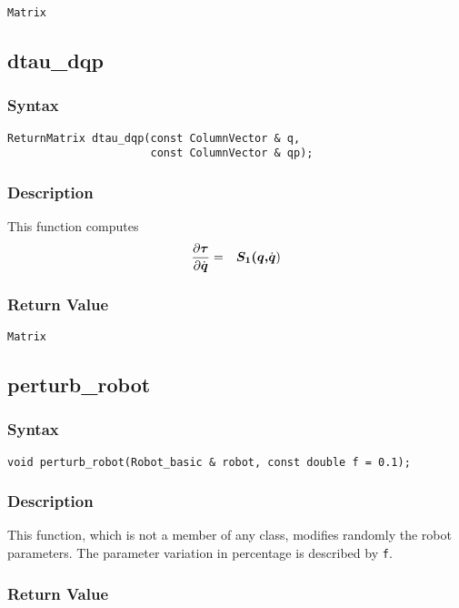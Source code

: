 \documentclass[dvips,11pt,fleqn]{report}
\newcommand{\mbold}[1]{\mbox{\boldmath $ #1 $}}
\newcommand{\dfdx}[2]{\frac{\partial #1}{\partial #2}}
\begin{document}
{\tt Matrix}

\newpage

\subsection*{dtau\_dqp}
\subsubsection*{Syntax}
\begin{verbatim}
ReturnMatrix dtau_dqp(const ColumnVector & q, 
                      const ColumnVector & qp);
\end{verbatim}
\subsubsection*{Description}
This function computes 
\begin{eqnarray}
\dfdx{\mbold{\tau}}{\dot{\mbold{q}}} & = & \mbold{S_1(q,}\dot{\mbold{q}}) 
\end{eqnarray}


\subsubsection*{Return Value}

{\tt Matrix}

\newpage

\subsection*{perturb\_robot}
\subsubsection*{Syntax}
\begin{verbatim}
void perturb_robot(Robot_basic & robot, const double f = 0.1);
\end{verbatim}
\subsubsection*{Description}
This function, which is not a member of any class, modifies randomly
the robot parameters. The parameter variation in percentage is
described by \texttt{f}.

\subsubsection*{Return Value}
\end{document}
